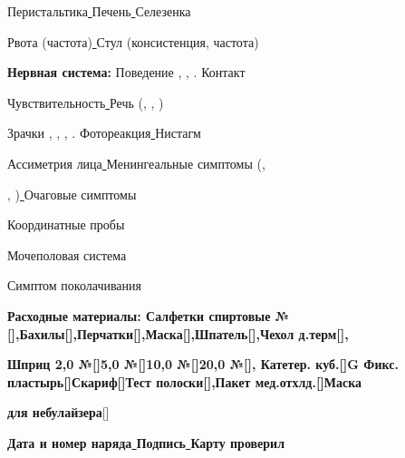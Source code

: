 \documentclass{medkarta}
\begin{document}
Перистальтика\uline{ \hfill}Печень\uline{ \hfill}Селезенка\uline{ \hfill}

Рвота (частота)\uline{ \hfill}Стул (консистенция, частота)\uline{ \hfill}

\textbf{Нервная система:} Поведение , , . Контакт\uline{ \hfill}

Чувствительность\uline{ \hfill}Речь (, , )\uline{ \hfill}

Зрачки , , , . Фотореакция\uline{ \hfill}Нистагм\uline{ \hfill}

Ассиметрия лица\uline{ \hfill}Менингеальные симптомы (,

, )\uline{ \hfill}Очаговые симптомы\uline{ \hfill}

Координатные пробы\uline{ \hfill}

Мочеполовая система\uline{ \hfill}

Симптом поколачивания\uline{ \hfill}

\begin{status}
\end{status}
\begin{data}
\end{data}
\begin{help}
\end{help}
\begin{recomend}
\end{recomend}
\begin{signal}
\end{signal}

\textbf{Расходные материалы: Салфетки спиртовые №[],Бахилы[],Перчатки[],Маска[],Шпатель[],Чехол д.терм[],}

\textbf{Шприц 2,0 №[]5,0 №[]10,0 №[]20,0 №[], Катетер. куб.[]G Фикс. пластырь[]Скариф[]Тест полоски[],Пакет мед.отхлд.[]Маска}

\textbf{для небулайзера}[]

\uline{ \hfill}

\textbf{Дата и номер наряда\uline{  \hfill}Подпись\uline{ \hfill}Карту проверил\uline{ \hfill}}
\end{document}
